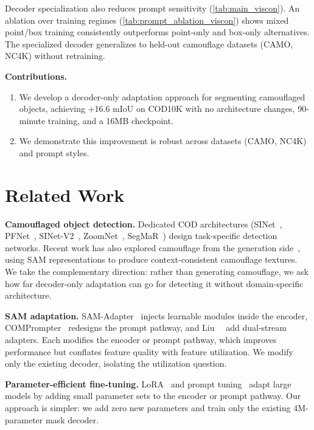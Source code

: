 \documentclass[10pt,twocolumn,letterpaper]{article}
\begin{document}
Decoder specialization also reduces prompt sensitivity (\cref{tab:main_viscon}). An ablation over training regimes (\cref{tab:prompt_ablation_viscon}) shows mixed point/box training consistently outperforms point-only and box-only alternatives. The specialized decoder generalizes to held-out camouflage datasets (CAMO, NC4K) without retraining.

\noindent\textbf{Contributions.}
\begin{enumerate}[nosep]
    \item We develop a decoder-only adaptation approach for segmenting camouflaged objects, achieving +16.6 mIoU on COD10K with no architecture changes, 90-minute training, and a 16MB checkpoint.
    \item We demonstrate this improvement is robust across datasets (CAMO, NC4K) and prompt styles.
\end{enumerate}

\section{Related Work}

\noindent\textbf{Camouflaged object detection.}
Dedicated COD architectures (SINet~\cite{fan2020cod10k}, PFNet~\cite{mei2021pfnet}, SINet-V2~\cite{fan2022sinetv2}, ZoomNet~\cite{pang2022zoomnet}, SegMaR~\cite{jia2022segmar}) design task-specific detection networks. Recent work has also explored camouflage from the generation side~\cite{das2025camouflage}, using SAM representations to produce context-consistent camouflage textures. We take the complementary direction: rather than generating camouflage, we ask how far decoder-only adaptation can go for detecting it without domain-specific architecture.

\noindent\textbf{SAM adaptation.}
SAM-Adapter~\cite{chen2023samadapter} injects learnable modules inside the encoder, COMPrompter~\cite{hao2024comprompter} redesigns the prompt pathway, and Liu~\etal~\cite{liu2025dualstream} add dual-stream adapters. Each modifies the encoder or prompt pathway, which improves performance but conflates feature quality with feature utilization. We modify only the existing decoder, isolating the utilization question.

\noindent\textbf{Parameter-efficient fine-tuning.}
LoRA~\cite{hu2022lora} and prompt tuning~\cite{lester2021prompt} adapt large models by adding small parameter sets to the encoder or prompt pathway. Our approach is simpler: we add zero new parameters and train only the existing 4M-parameter mask decoder.
\end{document}
